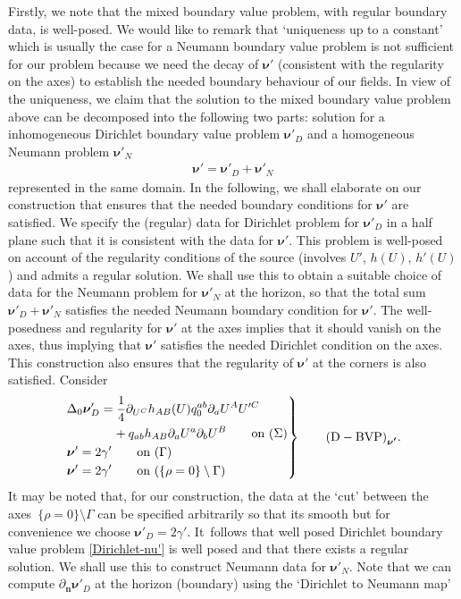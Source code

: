 \documentclass[11pt]{article}
\numberwithin{equation}{section}
\def\ptl{\partial}%
\def\mbo#1{\boldsymbol{#1}}%
\numberwithin{equation}{section}
\begin{document}
Firstly, we note that the mixed boundary value problem, with regular boundary data, is well-posed. We would like to remark that `uniqueness up to a constant' which is usually the case for a Neumann boundary value problem is not sufficient for our problem because we need the decay of $\mbo{\nu}'$ (consistent with the regularity on the axes) to establish the needed boundary behaviour of our fields.
In view of the uniqueness, we claim that the solution to the mixed boundary value problem above can be decomposed into the following two parts: solution for a inhomogeneous Dirichlet boundary value problem $\mbo{\nu'}_D$ and a homogeneous Neumann problem $\mbo{\nu}'_N$
\begin{align*}
\mbo{\nu}' = \mbo{\nu}'_D + \mbo{\nu}'_N
\end{align*}
represented in the same domain. In the following, we shall elaborate on our construction that ensures that the needed boundary conditions for $\mbo{\nu}'$ are satisfied. We specify the (regular) data for Dirichlet problem for $\mbo{\nu}'_D$ in a half plane such that it is consistent with the data for $\mbo{\nu}'$. This problem is well-posed on account of the regularity conditions of the source (involves $U'$, $h(U)$, $h'(U)$) and admits a regular solution. We shall use this to obtain a suitable choice of data for the Neumann problem for $\mbo{\nu}'_N$ at the horizon, so that the total sum $\mbo{\nu}'_D + \mbo{\nu}'_N$ satisfies the needed Neumann boundary condition for $\mbo{\nu}'$. The well-posedness and regularity for $\mbo{\nu}'$ at the axes implies that it should vanish on the axes, thus implying that $\mbo{\nu}'$ satisfies the needed Dirichlet condition on the axes. This construction also ensures that the regularity of $\mbo{\nu}'$ at the corners is also satisfied. Consider
\begin{equation} \label{Dirichlet-nu'}
\left.\begin{aligned}
&\Delta_0 \mbo{\nu}_D'=\frac{1}{4} \ptl_{U^C} h_{AB}(U) q^{ab}_{0} \ptl_a U^A U'^C\\
& \hphantom{\Delta_0 \mbo{\nu}_D'=}{} + q_{ab} h_{AB} \ptl_a U^a \ptl_b U^B \qquad \text{on}\ (\Sigma)\\
&\mbo{\nu}'=2 \gamma' \qquad \text{on} \ (\Gamma) \\
&\mbo{\nu}'=2 \gamma' \qquad \text{on} \ (\{ \rho=0\} \setminus \Gamma)
\end{aligned}
 \right\}
\qquad {\rm (D-BVP)}_{\mbo{\nu'}}.
\end{equation}
It may be noted that, for our construction, the data at the `cut' between the axes~${\{ \rho =0\} \setminus \Gamma}$ can be specified arbitrarily so that its smooth but for convenience we choose $ \mbo{\nu}'_D = 2 \gamma'$. It~follows that well posed Dirichlet boundary value problem \eqref{Dirichlet-nu'} is well posed and that there exists a regular solution. We shall use this to construct Neumann data for $\mbo{\nu}'_N$. Note that we can compute $\ptl_{\mbo{n}} \mbo{\nu}'_D$ at the horizon (boundary) using the `Dirichlet to Neumann map'
\end{document}
